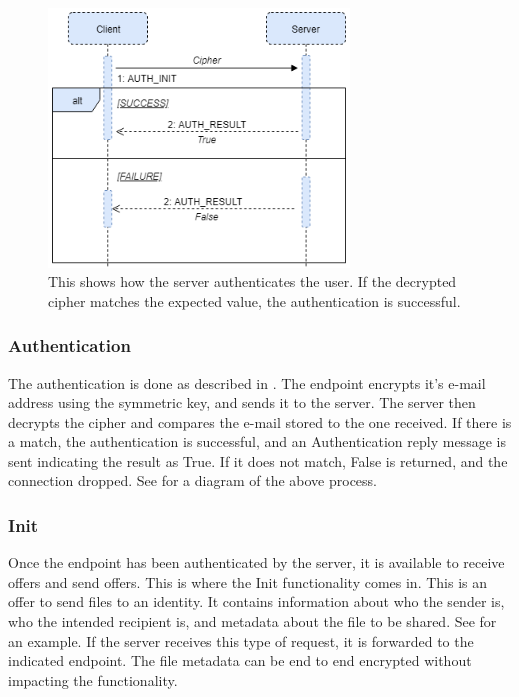 	\begin{figure}[th]
	  \centering
	  \includegraphics[width=80mm]{Figures/ACS_Prot/Auth_Init}
	  \decoRule
	  \caption[WS protocol: Authentication]{This shows how the server authenticates the user. If the decrypted cipher matches the expected value, the authentication is successful.}
	  \label{fig:prot_auth}
	\end{figure}

	\subsubsection*{Authentication}
	The authentication is done as described in . The endpoint encrypts it's e-mail address using the symmetric key, and sends it to the server. The server then decrypts the cipher and compares the e-mail stored to the one received. If there is a match, the authentication is successful, and an Authentication reply message is sent indicating the result as True. If it does not match, False is returned, and the connection dropped. See  for a diagram of the above process. %
	
	\subsubsection*{Init}
	Once the endpoint has been authenticated by the server, it is available to receive offers and send offers. This is where the Init functionality comes in. This is an offer to send files to an identity. It contains information about who the sender is, who the intended recipient is, and metadata about the file to be shared. See  for an example. If the server receives this type of request, it is forwarded to the indicated endpoint. The file metadata can be end to end encrypted without impacting the functionality.

